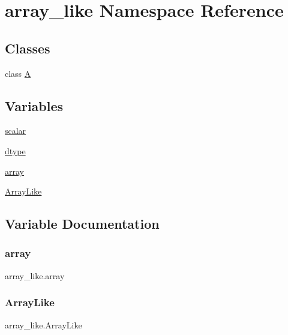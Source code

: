 \hypertarget{namespacearray__like}{}\section{array\+\_\+like Namespace Reference}
\label{namespacearray__like}
\subsection*{Classes}
\begin{DoxyCompactItemize}
\item 
class \hyperlink{classarray__like_1_1A}{A}
\end{DoxyCompactItemize}
\subsection*{Variables}
\begin{DoxyCompactItemize}
\item 
\hyperlink{namespacearray__like_abb19133135f9ae57f82b9aa22557eb37}{scalar}
\item 
\hyperlink{namespacearray__like_a5f71c8917ec8c16211148051136226e5}{dtype}
\item 
\hyperlink{namespacearray__like_ac365c61d654cf1ff6814b3d5c0f1279e}{array}
\item 
\hyperlink{namespacearray__like_a29b6a383a7a4de352cf1feb7e496fe36}{Array\+Like}
\end{DoxyCompactItemize}


\subsection{Variable Documentation}
\mbox{\label{namespacearray__like_ac365c61d654cf1ff6814b3d5c0f1279e}} 
\subsubsection{\texorpdfstring{array}{array}}
{\footnotesize\ttfamily array\+\_\+like.\+array}

\mbox{\label{namespacearray__like_a29b6a383a7a4de352cf1feb7e496fe36}} 
\subsubsection{\texorpdfstring{Array\+Like}{ArrayLike}}
{\footnotesize\ttfamily array\+\_\+like.\+Array\+Like}

